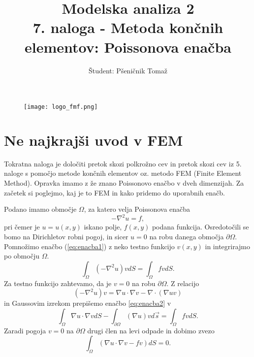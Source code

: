\documentclass[12pt,a4paper]{article}
\title{\textbf{Modelska analiza 2} \\ 7. naloga - Metoda končnih elementov: Poissonova enačba \\}
\author{Študent: Pšeničnik Tomaž}
\begin{document}

	\begin{figure} [h]
  \centering
  \texttt{[image: logo\_fmf.png]}
  \maketitle
\end{figure}
	
	
	
	\newpage
	
	
	
\section*{Ne najkrajši uvod v FEM}

Tokratna naloga je določiti pretok skozi polkrožno cev in pretok skozi cev iz 5. naloge s pomočjo metode končnih elementov oz. metodo FEM (Finite Element Method). Opravka imamo z že znano Poissonovo enačbo v dveh dimenzijah. Za začetek si poglejmo, kaj je to FEM in kako pridemo do uporabnih enačb.

Podano imamo območje $\Omega$, za katero velja Poissonova enačba
\begin{equation} \label{eq:enacba1}
- \nabla ^{2} u =f,
\end{equation}
pri čemer je $u=u(x,y)$ iskano polje, $f(x,y)$ podana funkcija. Osredotočili se bomo na Dirichletov robni pogoj, in sicer $u=0$ na robu danega območja $\partial \Omega$. Pomnožimo enačbo (\ref{eq:enacba1}) z neko testno funkcijo $v(x,y)$ in integrirajmo po območju $\Omega$.
\begin{equation} \label{eq:enacba2}
\int _{\Omega} (- \nabla ^{2} u) v dS = \int _{\Omega} f v dS.
\end{equation}
Za testno funkcijo zahtevamo, da je $v=0$ na robu $\partial \Omega$. Z relacijo
\begin{equation*}
(- \nabla ^{2} u) v= \nabla u \cdot \nabla v - \nabla \cdot (\nabla u v)
\end{equation*}
in Gaussovim izrekom prepišemo enačbo \ref{eq:enacba2} v
\begin{equation*}
\int _{\Omega}  \nabla u \cdot \nabla v dS  - \int _{\partial \Omega} (\nabla u)v d\vec{s} = \int_{\Omega} fv dS .
\end{equation*}
Zaradi pogoja $v=0$ na $\partial \Omega$ drugi člen na levi odpade in dobimo zvezo
\begin{equation} \label{eq:enacba3}
\int _{\Omega} (\nabla u \cdot \nabla v  - fv) dS=0.
\end{equation}
\end{document}
